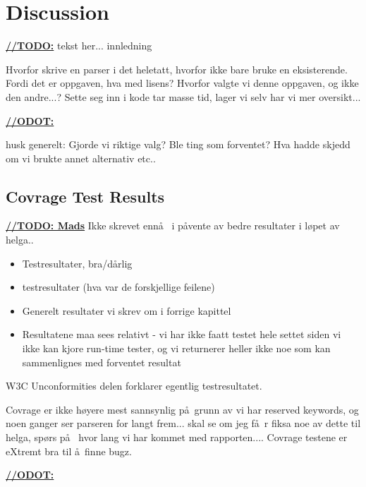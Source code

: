 \chapter{Discussion}
\underline{\textbf{\LARGE //TODO:}} tekst her... innledning

Hvorfor skrive en parser i det heletatt, hvorfor ikke bare bruke en eksisterende. Fordi det er oppgaven, hva med lisens? Hvorfor valgte vi denne oppgaven, og ikke den andre...? Sette seg inn i kode tar masse tid, lager vi selv har vi mer oversikt...

\underline{\textbf{\LARGE //ODOT:}}

husk generelt: Gjorde vi riktige valg? Ble ting som forventet? Hva hadde skjedd om vi brukte annet alternativ etc..

















\section{Covrage Test Results}
\label{sect:discussion:coverageResults}
\underline{\textbf{\LARGE //TODO: Mads}} Ikke skrevet enn\aa~ i p\aa vente av bedre resultater i l\o pet av helga..
\begin{itemize}
\item Testresultater, bra/d\aa rlig
\item testresultater (hva var de forskjellige feilene)
\item Generelt resultater vi skrev om i forrige kapittel
\item Resultatene maa sees relativt - vi har ikke faatt testet hele settet siden
vi ikke kan kjore run-time tester, og vi returnerer heller ikke noe som kan
sammenlignes med forventet resultat
\end{itemize}

W3C Unconformities delen forklarer egentlig testresultatet.

Covrage er ikke h\o yere mest sannsynlig p\aa~grunn av vi har reserved keywords, og noen ganger ser parseren for langt frem... skal se om jeg f\aa~r fiksa noe av dette til helga, sp\o rs p\aa~ hvor lang vi har kommet med rapporten.... Covrage testene er eXtremt bra til \aa~finne bugz.

\underline{\textbf{\LARGE //ODOT:}}